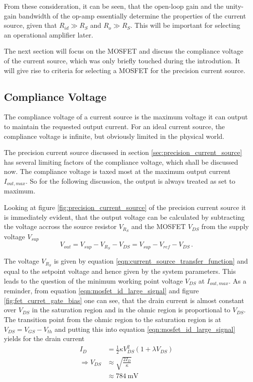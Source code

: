 From these consideration, it can be seen, that the open-loop gain and the unity-gain bandwidth of the op-amp essentially determine the properties of the current source, given that $R_{id} \gg R_S$ and $R_o \gg R_S$. This will be important for selecting an operational amplifier later.

The next section will focus on the MOSFET and discuss the compliance voltage of the current source, which was only briefly touched during the introdution. It will give rise to criteria for selecting a MOSFET for the precision current source.

\clearpage
\subsection{Compliance Voltage}
\label{sec:compliance_voltage}
The compliance voltage of a current source is the maximum voltage it can output to maintain the requested output current. For an ideal current source, the compliance voltage is infinite, but obviously limited in the physical world.

The precision current source discussed in section \ref{sec:precision_current_source} has several limiting factors of the compliance voltage, which shall be discussed now. The compliance voltage is taxed most at the maximum output current $I_{out,max}$. So for the following discussion, the output is always treated as set to maximum.

Looking at figure \ref{fig:precision_current_source} of the precision current source it is immediately evident, that the output voltage can be calculated by subtracting the voltage accross the source resistor $V_{R_S}$ and the MOSFET $V_{DS}$ from the supply voltage $V_{sup}$
\begin{equation}
    V_{out} = V_{sup} - V_{R_S} - V_{DS} = V_{sup} - V_{ref} - V_{DS} \nonumber\,.
\end{equation}

The voltage $V_{R_S}$ is given by equation \ref{eqn:current_source_transfer_function} and equal to the setpoint voltage and hence given by the system parameters. This leads to the question of the minimum working point voltage $V_{DS}$ at $I_{out,max}$. As a reminder, from equation \ref{eqn:mosfet_id_large_signal} and figure \ref{fig:fet_curret_gate_bias} one can see, that the drain current is almost constant over $V_{DS}$ in the saturation region and in the ohmic region is proportional to $V_{DS}$. The transition point from the ohmic region to the saturation region is at $V_{DS} = V_{GS} - V_{th}$ and putting this into equation \ref{eqn:mosfet_id_large_signal} yields for the drain current
\begin{align}
    I_D &= \frac{1}{2} \kappa V_{DS}^2 \left(1+ \lambda V_{DS}\right) \nonumber\\
    \Rightarrow V_{DS} &\approx \sqrt{\frac{2 I_D}{\kappa}}\\
    &\approx \qty{784}{\mV}
\end{align}

